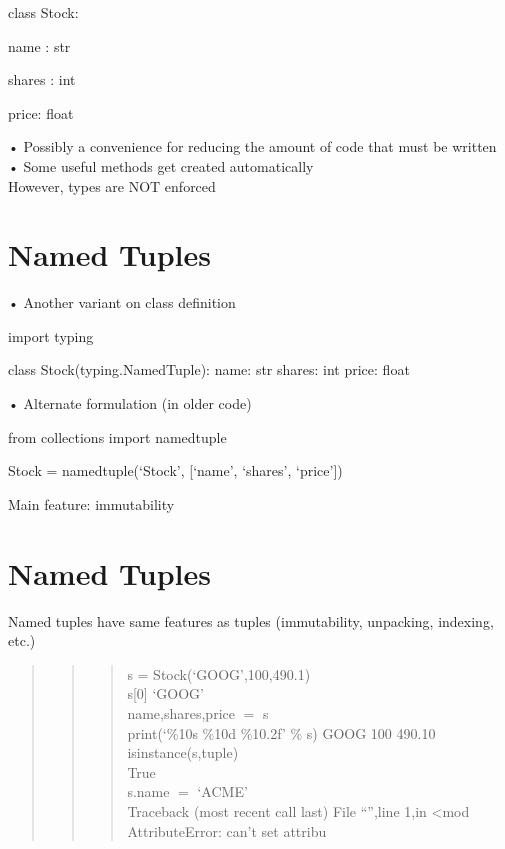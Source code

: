 \documentclass[
  letterpaper,
  DIV=11,
  numbers=noendperiod]{scrreprt}
\begin{document}
class Stock:

name : str

shares : int

price: float

• Possibly a convenience for reducing the amount of code that must be
written\\
• Some useful methods get created automatically\\
However, types are NOT enforced


\chapter{Named Tuples}\label{named-tuples}

• Another variant on class definition

import typing

class Stock(typing.NamedTuple): name: str shares: int price: float

• Alternate formulation (in older code)

from collections import namedtuple

Stock = namedtuple(`Stock', {[}`name', `shares', `price'{]})

Main feature: immutability


\chapter{Named Tuples}\label{named-tuples-1}

Named tuples have same features as tuples (immutability, unpacking,
indexing, etc.)

\begin{quote}
\begin{quote}
\begin{quote}
s = Stock(`GOOG',100,490.1)\\
s{[}0{]} `GOOG'\\
name,shares,price \(=\) s\\
print(`\%10s \%10d \%10.2f' \(\%\) s) GOOG 100 490.10\\
isinstance(s,tuple)\\
True\\
s.name \(=\) `ACME'\\
Traceback (most recent call last) File ``'',line 1,in \textless mod
AttributeError: can't set attribu
\end{quote}
\end{quote}
\end{quote}
\end{document}
